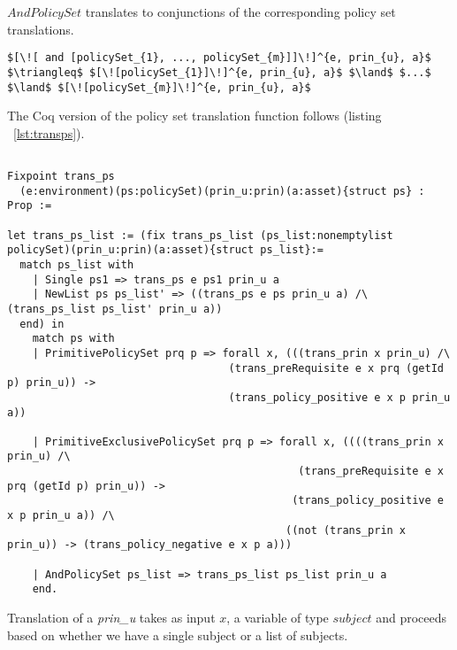 $AndPolicySet$ translates to conjunctions of the corresponding policy set translations. 

\lstset{mathescape, language=AST}  
\begin{lstlisting}[frame=single, caption={Policy Set Translation {$\colon$} AndPolicySet},label={lst:transpolicyformulaAndPolicySet}]
$[\![ and [policySet_{1}, ..., policySet_{m}]]\!]^{e, prin_{u}, a}$ $\triangleq$ $[\![policySet_{1}]\!]^{e, prin_{u}, a}$ $\land$ $...$ $\land$ $[\![policySet_{m}]\!]^{e, prin_{u}, a}$

\end{lstlisting}

The Coq version of the policy set translation function follows (listing ~\ref{lst:transps}).

\begin{minipage}{\linewidth}
\begin{lstlisting}

Fixpoint trans_ps
  (e:environment)(ps:policySet)(prin_u:prin)(a:asset){struct ps} : Prop :=

let trans_ps_list := (fix trans_ps_list (ps_list:nonemptylist policySet)(prin_u:prin)(a:asset){struct ps_list}:=
  match ps_list with
    | Single ps1 => trans_ps e ps1 prin_u a
    | NewList ps ps_list' => ((trans_ps e ps prin_u a) /\ (trans_ps_list ps_list' prin_u a))
  end) in
    match ps with
    | PrimitivePolicySet prq p => forall x, (((trans_prin x prin_u) /\ 
                                   (trans_preRequisite e x prq (getId p) prin_u)) -> 
                                   (trans_policy_positive e x p prin_u a))  

    | PrimitiveExclusivePolicySet prq p => forall x, ((((trans_prin x prin_u) /\ 
                                              (trans_preRequisite e x prq (getId p) prin_u)) -> 
                                             (trans_policy_positive e x p prin_u a)) /\
                                            ((not (trans_prin x prin_u)) -> (trans_policy_negative e x p a)))
                   
    | AndPolicySet ps_list => trans_ps_list ps_list prin_u a
    end.
\end{lstlisting}
\end{minipage}

Translation of a \emph{prin_{u}} takes as input $x$, a variable of type $subject$ and proceeds based on whether we have a single subject or a list of subjects.  

